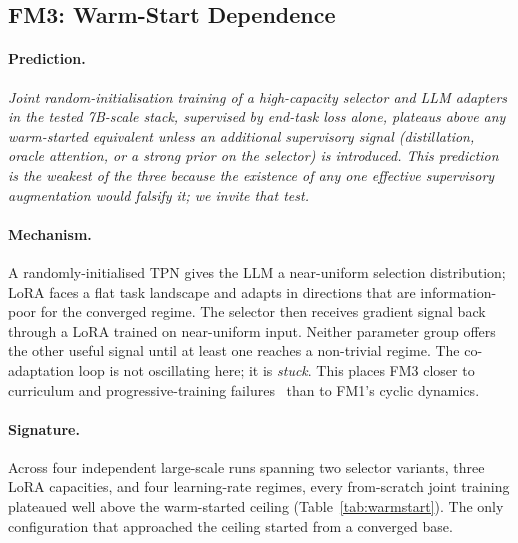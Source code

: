 \documentclass[runningheads]{llncs}
\begin{document}
\subsection{FM3: Warm-Start Dependence}
\label{sec:warmstart}

\paragraph{Prediction.}
\emph{Joint random-initialisation training of a high-capacity selector
and LLM adapters in the tested 7B-scale stack, supervised by end-task loss
alone, plateaus above any warm-started equivalent unless an additional
supervisory signal (distillation, oracle attention, or a strong prior on
the selector) is introduced. This prediction is the weakest of the three
because the existence of any one effective supervisory augmentation
would falsify it; we invite that test.}

\paragraph{Mechanism.}
A randomly-initialised TPN gives the LLM a near-uniform selection
distribution; LoRA faces a flat task landscape and adapts in directions
that are information-poor for the converged regime. The selector then
receives gradient signal back through a LoRA trained on near-uniform
input. Neither parameter group offers the other useful signal until at
least one reaches a non-trivial regime. The co-adaptation loop is not
oscillating here; it is \emph{stuck}. This places FM3 closer to
curriculum and progressive-training failures~\cite{bengio2009curriculum}
than to FM1's cyclic dynamics.

\paragraph{Signature.}
Across four independent large-scale runs spanning two selector variants,
three LoRA capacities, and four learning-rate regimes, every
from-scratch joint training plateaued well above the warm-started
ceiling (Table~\ref{tab:warmstart}). The only configuration that
approached the ceiling started from a converged base.
\end{document}
